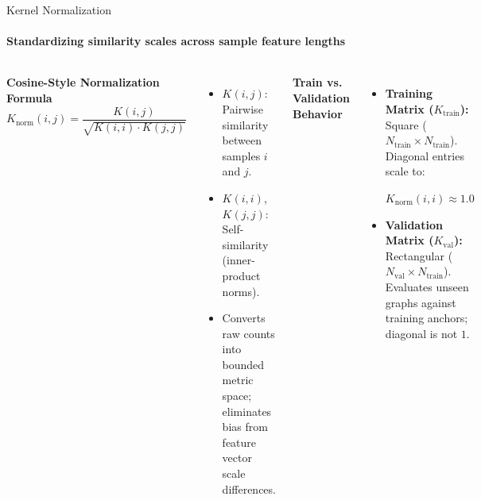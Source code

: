 \documentclass[aspectratio=169, 11pt]{beamer}
\begin{document}
\begin{frame}{Kernel Normalization}
    \framesubtitle{Standardizing similarity scales across sample feature lengths \cite{scholkopf2002learning}}

    \begin{columns}[T]
        \textbf{Cosine-Style Normalization Formula \cite{scholkopf2002learning}}
        \vspace{0.1cm}
        \begin{equation*}
            K_{\text{norm}}(i,j) = \frac{K(i,j)}{\sqrt{K(i,i) \cdot K(j,j)}}
        \end{equation*}

        \vspace{0.1cm}
        \begin{itemize}\scriptsize
            \item $K(i,j)$: Pairwise similarity between samples $i$ and $j$.
            \item $K(i,i)$, $K(j,j)$: Self-similarity (inner-product norms).
            \item Converts raw counts into bounded metric space; eliminates bias from feature vector scale differences.
        \end{itemize}

        \textbf{Train vs. Validation Behavior}
        \vspace{0.15cm}

        \begin{itemize}\footnotesize
            \item \textbf{Training Matrix ($K_{\text{train}}$):} \\
            Square ($N_{\text{train}} \times N_{\text{train}}$). Diagonal entries scale to:
            \begin{center}
                \small\bfseries $K_{\text{norm}}(i,i) \approx 1.0$
            \end{center}
            \item \textbf{Validation Matrix ($K_{\text{val}}$):} \\
            Rectangular ($N_{\text{val}} \times N_{\text{train}}$). Evaluates unseen graphs against training anchors; diagonal is not $1$.
        \end{itemize}
    \end{columns}


\end{frame}
\end{document}
